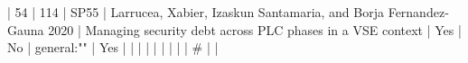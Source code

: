 | 54 |        114 | SP55 | Larrucea, Xabier, Izaskun Santamaria, and Borja Fernandez‐Gauna 2020 | Managing security debt across PLC phases in a VSE context                                                                                                                | Yes                                                                                                                                                                                                                                                      | No                                                                                                                                                                                                                                                                 | general:""                                                                                                                                                                                                                                                                                               | Yes                                                                                                                                                                                                                                                                                                                                                                                                                                                                                      |
|    |            |      |                                                                      |                                                                                                                                                                          |                                                                                                                                                                                                                                                            |                                                                                                                                                                                                                                                                      | #                                                                                                                                                                                                                                                                                                        |                                                                                                                                                                                                                                                                                                                                                                                                                                                                                              |
